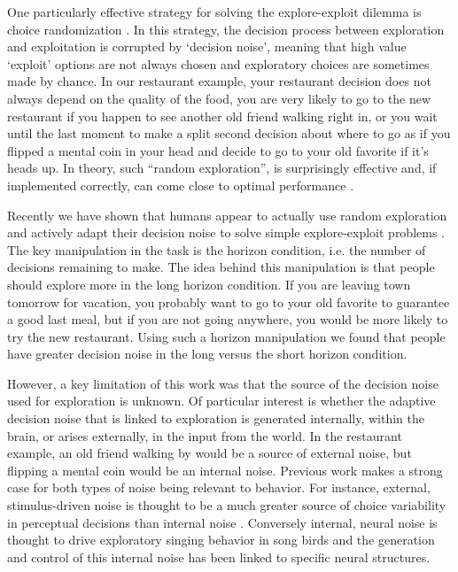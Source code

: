\documentclass[12pt]{article}
\begin{document}
	One particularly effective strategy for solving the explore-exploit dilemma is choice randomization \cite{}. In this strategy, the decision process between exploration and exploitation is corrupted by `decision noise', meaning that high value `exploit' options are not always chosen and exploratory choices are sometimes made by chance. In our restaurant example, your restaurant decision does not always depend on the quality of the food, you are very likely to go to the new restaurant if you happen to see another old friend walking right in, or you wait until the last moment to make a split second decision about where to go as if you flipped a mental coin in your head and decide to go to your old favorite if it's heads up. In theory, such “random exploration”, is surprisingly effective and, if implemented correctly, can come close to optimal performance \cite{}. 
	
	Recently we have shown that humans appear to actually use random exploration and actively adapt their decision noise to solve simple explore-exploit problems \cite{}.  The key manipulation in the task is the horizon condition, i.e. the number of decisions remaining to make. The idea behind this manipulation is that people should explore more in the long horizon condition. If you are leaving town tomorrow for vacation, you probably want to go to your old favorite to guarantee a good last meal, but if you are not going anywhere, you would be more likely to try the new restaurant. Using such a horizon manipulation we found that people have greater decision noise in the long versus the short horizon condition. 
	
	However, a key limitation of this work was that the source of the decision noise used for exploration is unknown. Of particular interest is whether the adaptive decision noise that is linked to exploration is generated internally, within the brain, or arises externally, in the input from the world. In the restaurant example, an old friend walking by would be a source of external noise, but flipping a mental coin would be an internal noise. Previous work makes a strong case for both types of noise being relevant to behavior. For instance, external, stimulus-driven noise is thought to be a much greater source of choice variability in perceptual decisions than internal noise \cite{}. Conversely internal, neural noise is thought to drive exploratory singing behavior in song birds \cite{} and the generation and control of this internal noise has been linked to specific neural structures. 
	
\end{document}
